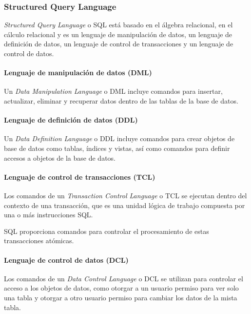 \subsubsection{Structured Query Language}
\textit{Structured Query Language} o SQL está basado en el álgebra relacional, en el cálculo relacional y es un lenguaje de manipulación de datos, un lenguaje de definición de datos, un lenguaje de control de transacciones y un lenguaje de control de datos.

\paragraph*{Lenguaje de manipulación de datos (DML)}
Un \textit{Data Manipulation Language} o DML incluye comandos para insertar, actualizar, eliminar y recuperar datos dentro de las tablas de la base de datos. 

\paragraph*{Lenguaje de definición de datos (DDL)}
 Un \textit{Data Definition Language} o DDL incluye comandos para crear objetos de base de datos como tablas, índices y vistas, así como comandos para definir accesos a objetos de la base de datos. 

\paragraph*{Lenguaje de control de transacciones (TCL)}
Los comandos de un \textit{Transaction Control Language} o TCL se ejecutan dentro del contexto de una transacción, que es una unidad lógica de trabajo compuesta por una o más instrucciones SQL. 


SQL proporciona comandos para controlar el procesamiento de estas transacciones atómicas.

\paragraph*{Lenguaje de control de datos (DCL)}
Los comandos de un \textit{Data Control Language} o DCL se utilizan para controlar el acceso a los objetos de datos, como otorgar a un usuario permiso para ver solo una tabla y otorgar a otro usuario permiso para cambiar los datos de la mista tabla.
